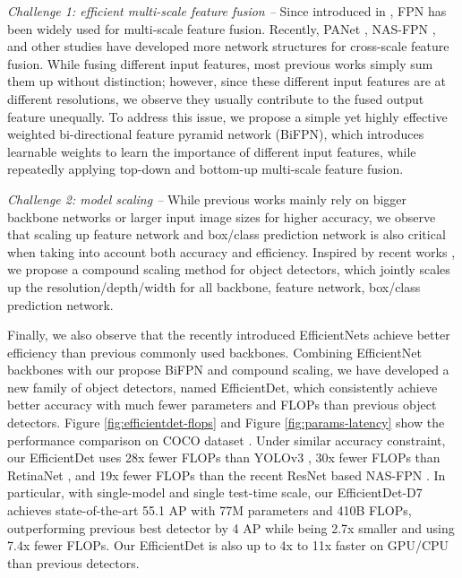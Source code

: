 \documentclass[10pt,twocolumn,letterpaper]{article}
\begin{document}
\emph{Challenge 1: efficient multi-scale feature fusion -- }  Since  introduced in \cite{fpn17},  FPN has been widely used for multi-scale feature fusion. Recently, PANet \cite{panet18}, NAS-FPN \cite{nasfpn19}, and other studies \cite{deepfpn18,parallelFPN18,m2det19} have developed more network structures for cross-scale feature fusion. While fusing different input features, most previous works simply sum them up without distinction; however, since these different input features are at different resolutions, we observe they usually contribute to the fused output feature unequally. To address this issue, we propose a simple yet highly effective weighted bi-directional feature pyramid network (BiFPN), which introduces learnable weights to learn the importance of different input features, while repeatedly applying top-down and bottom-up multi-scale feature fusion.


\emph{Challenge 2: model scaling  -- } While previous works mainly  rely on bigger backbone networks \cite{retinanet17,fasterrcnn15,yolov318,nasfpn19} or larger input image sizes \cite{maskrcnn17,odaa19} for higher accuracy, we observe that scaling up feature network and  box/class prediction network is also critical when taking into account both accuracy and efficiency. Inspired by recent works \cite{efficientnet19}, we propose a compound scaling method for object detectors, which jointly scales up the resolution/depth/width for all backbone, feature network, box/class prediction network.

Finally, we also observe that the recently introduced EfficientNets \cite{efficientnet19} achieve better  efficiency than previous commonly used backbones. Combining EfficientNet backbones with our propose BiFPN and compound scaling, we have developed a new family of object detectors, named EfficientDet, which consistently achieve better accuracy with  much fewer parameters and FLOPs  than previous object detectors. Figure \ref{fig:efficientdet-flops} and Figure \ref{fig:params-latency} show the performance comparison on COCO dataset \cite{coco14}. Under similar accuracy constraint, our EfficientDet uses 28x fewer FLOPs than YOLOv3 \cite{yolov318}, 30x fewer FLOPs than RetinaNet \cite{retinanet17}, and 19x fewer FLOPs than the recent ResNet based NAS-FPN \cite{nasfpn19}.  In particular, with single-model and single test-time scale, our EfficientDet-D7 achieves state-of-the-art  55.1 AP with 77M parameters and 410B FLOPs,  outperforming previous best detector \cite{odaa19} by 4 AP while being 2.7x smaller and using 7.4x fewer FLOPs. Our EfficientDet is also up to 4x to 11x faster on GPU/CPU than previous detectors.
\end{document}
